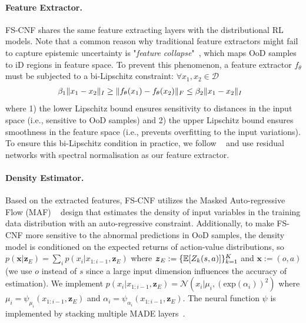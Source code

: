 \documentclass[letterpaper]{article} %
\newcommand{\datapoint}{x}
\newcommand{\condition}{\boldsymbol{z}_{E}}
\newcommand{\state}{s}
\newcommand{\observation}{o}
\newcommand{\action}{a}
\newcommand{\agentIndex}{k}
\newcommand{\dataset}{\mathcal{D}}
\newcommand{\expect}{\mathbb{E}}
\begin{document}
\paragraph{Feature Extractor.} FS-CNF shares the same feature extracting layers with the distributional RL models. 
Note that a common reason why traditional feature extractors might fail to capture epistemic uncertainty is "{\it feature collapse}"~\cite{Amersfoort2020FeatureCollapse}, which maps OoD samples to iD regions in feature space. To prevent this phenomenon, a feature extractor $f_{\theta}$ must be subjected to a bi-Lipschitz constraint: $\forall{\datapoint_{1},\datapoint_{2}\in\dataset}$
\begin{align}
\hspace{-0.12in}\beta_{1}\|\datapoint_{1}-\datapoint_{2}\|_{I}\geq\|f_{\theta}(\datapoint_{1})-f_{\theta}(\datapoint_{2})\|_{F}\leq\beta_{2}\|\datapoint_{1}-\datapoint_{2}\|_{I}
\end{align}
where 1) the lower Lipschitz bound ensures sensitivity to distances in the input space (i.e., sensitive to OoD samples) and 2) the upper Lipschitz bound ensures smoothness in the feature space (i.e., prevents overfitting to the input variations). To ensure this bi-Lipschitz condition in practice, we follow ~\cite{Amersfoort2020FeatureCollapse} and use residual networks with spectral normalisation as our feature extractor.

\paragraph{Density Estimator.} Based on the extracted features, FS-CNF utilizes the Masked Auto-regressive Flow (MAF)
~\cite{Papamakarios2017MAF} design that estimates the density of input variables in the training data distribution with an auto-regressive constraint. Additionally, to make FS-CNF more sensitive to the abnormal predictions in OoD samples, the density model is conditioned on the expected returns of action-value distributions, so $p(\boldsymbol{\datapoint}|{\condition})=\sum_{i}p(\datapoint_{i}|\datapoint_{1:i-1},{\condition})$  where ${\condition}:=\{\expect[Z_{\agentIndex}(\state,\action)]\}_{\agentIndex=1}^{\MakeUppercase{\agentIndex}}$ and $\boldsymbol{\datapoint}:=(\observation,\action)$ (we use $\observation$ instead of $\state$ since a large input dimension influences the accuracy of estimation). We implement $p(\datapoint_{i}|\datapoint_{1:i-1},\condition)=\mathcal{N}(\datapoint_{i}|\mu_{i},(\text{exp}(\alpha_{i}))^{2})$ where $\mu_{i}=\psi_{\mu_{i}}(\datapoint_{1:i-1},\condition)$ and $\alpha_{i} = \psi_{\alpha_{i}}(\datapoint_{1:i-1},\condition)$. The neural function $\psi$ is implemented by stacking multiple MADE layers~\cite{Dias2020NFAnomaly}.
\end{document}
